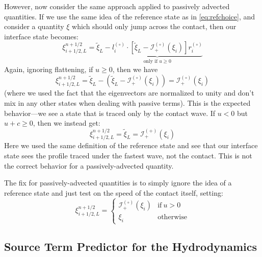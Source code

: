\documentclass[iop,numberedappendix]{../emulateapj}
\newcommand{\evz}{{(\circ)}}
\newcommand{\evp}{{(+)}}
\begin{document}
However, now consider the same approach applied to passively advected quantities.
If we use the same idea of the reference state as
in \autoref{eq:refchoice}, and consider a quantity $\xi$ which should only
jump across the contact, then our interface state becomes:
\begin{equation}
\xi_{i+1/2,L}^{n+1/2} = \tilde{\xi}_L -
  \underbrace{l_i^\evz \cdot \left [
        \tilde{\xi}_L  - \mathcal{I}^\evz_+(\xi_i)
       \right ] r_i^\evz}_{\text{only if~$u \ge 0$}}
\end{equation}
Again, ignoring flattening, if $u \ge 0$, then we have
\begin{equation}
\xi_{i+1/2,L}^{n+1/2} = \tilde{\xi}_L -
  \left (\tilde{\xi}_L  - \mathcal{I}^\evz_+(\xi_i) \right ) = \mathcal{I}^\evz_+(\xi_i)
\end{equation}
(where we used the fact that the eigenvectors are normalized to unity and
don't mix in any other states when dealing with passive terms).  This
is the expected behavior---we see a state that is traced only by the
contact wave.  If $u < 0$ but $u + c \ge 0$, then we instead get:
\begin{equation}
\xi_{i+1/2,L}^{n+1/2} = \tilde{\xi}_L = \mathcal{I}^\evp_+(\xi_i)
\end{equation}
Here we used the same definition of the reference state and see that our
interface state sees the profile traced under the fastest wave, not the
contact.  This is not the correct behavior for a passively-advected
quantity.  

The fix for passively-advected quantities is to simply ignore the 
idea of a reference state and just test on the speed of the contact
itself, setting:
\begin{equation}
\xi_{i+1/2,L}^{n+1/2} = \left \{ \begin{array}{cc}
       \mathcal{I}_+^\evz(\xi_i) & \mathrm{if~} u  > 0 \\
       \xi_i                    & \mathrm{otherwise}
\end{array}
\right .
\end{equation}

\subsection{Source Term Predictor for the Hydrodynamics}
\label{sec:source_term_predictor}
\end{document}
